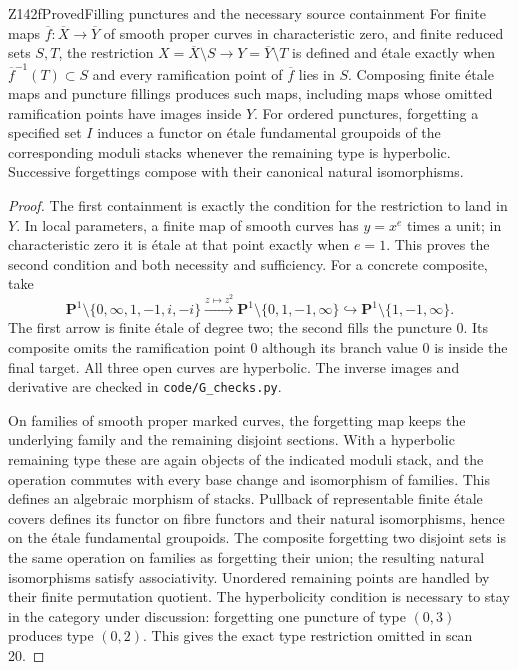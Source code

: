 \begin{result}{Z142f}{Proved}{Filling punctures and the necessary source containment}
For finite maps $\overline f:\overline X\to\overline Y$ of smooth
proper curves in characteristic zero, and finite reduced sets $S,T$,
the restriction $X=\overline X\setminus S\to
Y=\overline Y\setminus T$ is defined and \'etale exactly when
$\overline f^{-1}(T)\subset S$ and every ramification point of
$\overline f$ lies in $S$. Composing finite \'etale maps and puncture
fillings produces such maps, including maps whose omitted
ramification points have images inside $Y$.
For ordered punctures, forgetting a specified set $I$ induces a
functor on \'etale fundamental groupoids of the corresponding moduli
stacks whenever the remaining type is hyperbolic. Successive
forgettings compose with their canonical natural isomorphisms.
\end{result}
\begin{proof}
The first containment is exactly the condition for the restriction to
land in $Y$. In local parameters, a finite map of smooth curves has
$y=x^e$ times a unit; in characteristic zero it is \'etale at that
point exactly when $e=1$. This proves the second condition and both
necessity and sufficiency. For a concrete composite, take
\[
 \mathbf P^1\setminus\{0,\infty,1,-1,i,-i\}
   \xrightarrow{z\mapsto z^2}
 \mathbf P^1\setminus\{0,1,-1,\infty\}
   \hookrightarrow
 \mathbf P^1\setminus\{1,-1,\infty\}.
\]
The first arrow is finite \'etale of degree two; the second fills the
puncture $0$. Its composite omits the ramification point $0$ although
its branch value $0$ is inside the final target. All three open curves
are hyperbolic. The inverse images and derivative are checked in
\texttt{code/G\_checks.py}.

On families of smooth proper marked curves, the forgetting map keeps
the underlying family and the remaining disjoint sections. With a
hyperbolic remaining type these are again objects of the indicated
moduli stack, and the operation commutes with every base change and
isomorphism of families. This defines an algebraic morphism of stacks.
Pullback of representable finite \'etale covers defines its functor on
fibre functors and their natural isomorphisms, hence on the \'etale
fundamental groupoids. The composite forgetting two disjoint sets is
the same operation on families as forgetting their union; the
resulting natural isomorphisms satisfy associativity. Unordered
remaining points are handled by their finite permutation quotient.
The hyperbolicity condition is necessary to stay in the category
under discussion: forgetting one puncture of type $(0,3)$ produces
type $(0,2)$. This gives the exact type restriction omitted in scan 20.
\end{proof}

